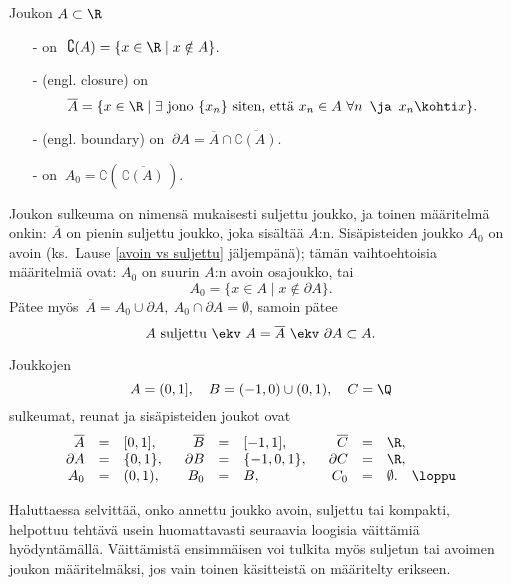 \begin{Def}
 
 
Joukon $A\subset\R$
\begin{itemize}
\item[-]  on $\ \complement(A)=\{x\in\R \mid x\notin A\}$.
\item[-]  (engl. closure) on 
\[
\overline{A}=\{x\in\R \mid \exists\ \text{jono}\ \{x_n\}\ \text{siten, että}\ 
                                     x_n\in A\ \forall n\,\ \ja\,\ x_n \kohti x\}.
\]
\item[-]  (engl. boundary) on 
         $\ \partial A=\overline{A}\cap \overline{\complement(A)}$.
\item[-] \kor{sisäpisteiden joukko} on $\ A_0 = \complement(\,\overline{\complement(A)}\,)$.
\end{itemize}
\end{Def}
Joukon sulkeuma on nimensä mukaisesti suljettu joukko, ja toinen määritelmä onkin:
$\overline{A}$ on pienin suljettu joukko, joka sisältää $A$:n. Sisäpisteiden joukko $A_0$ on
avoin (ks.\ Lause \ref{avoin vs suljettu} jäljempänä); tämän vaihtoehtoisia määritelmiä ovat:
$A_0$ on suurin $A$:n avoin osajoukko, tai
\[ 
A_0 = \{x \in A \mid x \not\in \partial A\}. 
\]
Pätee myös $\,\overline{A} = A_0 \cup \partial A,\ A_0 \cap \partial A = \emptyset$, samoin
pätee
\[ 
A\ \text{suljettu}\ \ekv\ A = \overline{A}\ \ekv\ \partial A \subset A.
\]
\begin{Exa}
Joukkojen
\[
A=(0,1],\quad B=(-1,0)\cup (0,1),\quad C=\Q
\]
sulkeumat, reunat ja sisäpisteiden joukot ovat
\[
\begin{array}{rclrclrcl}
\overline{A} &=& [0,1],\   & \overline{B} &=& [-1,1],\      & \overline{C} &=& \R, \\
  \partial A &=& \{0,1\},\ & \ \partial B &=&  \{-1,0,1\},\ & \ \partial C &=& \R, \\
         A_0 &=& (0,1),    & B_0          &=& B,\           & C_0          &=& \emptyset. 
                                                                           \quad\loppu  
\end{array}
\]
\end{Exa}
Haluttaessa selvittää, onko annettu joukko avoin, suljettu tai kompakti, helpottuu tehtävä
usein huomattavasti seuraavia loogisia väittämiä hyödyntämällä. Väittämistä ensimmäisen voi
tulkita myös suljetun tai avoimen joukon määritelmäksi, jos vain toinen käsitteistä on
määritelty erikseen. 
